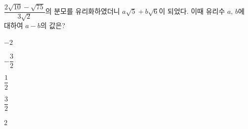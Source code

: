 $\dfrac{2\sqrt{10}-\sqrt{75}}{3\sqrt{2}}$의 분모를 유리화하였더니 $a\sqrt{5}+b\sqrt{6}$이 되었다. 이때 유리수 $a$, $b$에 대하여 $a-b$의 값은?
\begin{choices32}{\rule[-3ex]{0pt}{8ex}$-2$}{\rule[-3ex]{0pt}{8ex}$-\dfrac{3}{2}$}{\rule[-3ex]{0pt}{8ex}$\dfrac{1}{2}$}{\rule[-3ex]{0pt}{8ex}$\dfrac{3}{2}$}{\rule[-3ex]{0pt}{8ex}$2$}\end{choices32}
